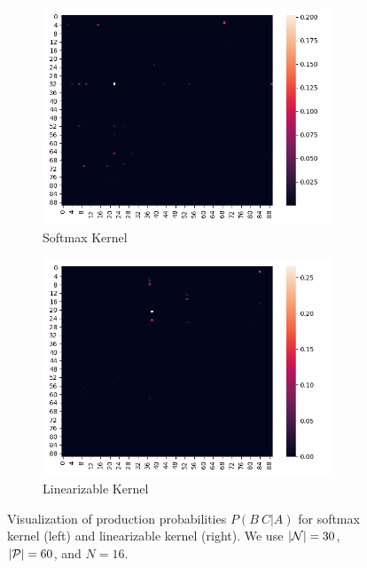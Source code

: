 \documentclass{article}
\begin{document}
\begin{figure}[!htp]
  \centering
  \begin{subfigure}[t]{0.45\textwidth}
  \centering
  \includegraphics[width=0.95\textwidth]{imgs/softmax/15_exp.png}
  \caption{Softmax Kernel}
  \end{subfigure}
  \begin{subfigure}[t]{0.45\textwidth}
  \centering
  \includegraphics[width=0.95\textwidth]{imgs/rff/15_exp.png}
  \caption{Linearizable Kernel}
  \end{subfigure}
  \caption{\label{fig:example_production4}Visualization of production probabilities $P(B\ C|A)$ for softmax kernel (left) and linearizable kernel (right). We use $|\mathcal{N}|=30$, $|\mathcal{P}|=60$, and $N=16$.}
\end{figure}
\end{document}
